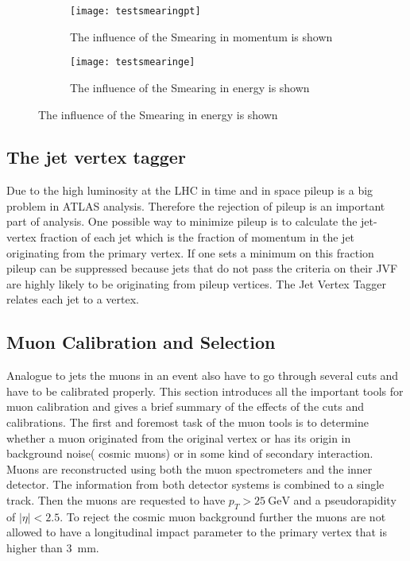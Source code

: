 \begin{figure}
\centering
\begin{subfigure}[b]{0.5\figwidth}
\texttt{[image: testsmearingpt]}
\caption[Influence of the Smearing on the transversal momentum]{The influence of the Smearing in momentum is shown}
\label{fig:testsmearingpt}
\end{subfigure}
\quad
\begin{subfigure}[b]{0.5\figwidth}
\texttt{[image: testsmearinge]}
\caption[Influence of the Smearing on the energy]{The influence of the Smearing in energy is shown}
\label{fig:testsmearinge}
\end{subfigure}
\end{figure}


\subsection{The jet vertex tagger}

Due to the high luminosity at the LHC in time and in space pileup is a big problem in ATLAS analysis. Therefore the rejection of pileup is an important part of analysis. One possible way to minimize pileup is to calculate the jet-vertex fraction of each jet which is the fraction of momentum in the jet originating from the primary vertex. If one sets a minimum on this fraction pileup can be suppressed because jets that do not pass the criteria on their JVF are highly likely to be originating from pileup vertices. The Jet Vertex Tagger relates each jet to a vertex.


\subsection{Muon Calibration and Selection}

Analogue to jets the muons in an event also have to go through several cuts and have to be calibrated properly. This section introduces all the important tools for muon calibration and gives a brief summary of the effects of the cuts and calibrations.
The first and foremost task of the muon tools is to determine whether a muon originated from the original vertex or has its origin in background noise( cosmic muons) or in some kind of secondary interaction. Muons are reconstructed using both the muon spectrometers and the inner detector. The information from both detector systems is combined to a single track. Then the muons are requested to have $p_T > \SI{25}{\GeV}$ and a pseudorapidity of $|\eta| < \num{2.5}$. To reject the cosmic muon background further the muons are not allowed to have a longitudinal impact parameter to the primary vertex that is higher than \SI{3}{\mm}. 

